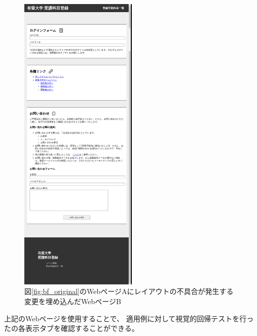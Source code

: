 \begin{figure}[htbp]
    \centering
    \includegraphics[width=0.5\textwidth]{image/5/original_png/af_original.png}
    \caption{図\ref{fig:bf_original}のWebページAにレイアウトの不具合が発生する変更を埋め込んだWebページB}
    \label{fig:af_original}
\end{figure}
上記のWebページを使用することで、
適用例に対して視覚的回帰テストを行った\toolName の各表示タブを確認することができる。

